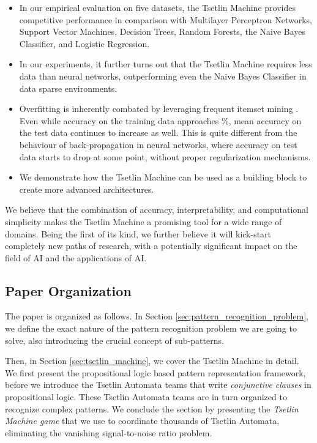 \documentclass[11pt,a4paper]{article}
\begin{document}
\begin{itemize}
\item In our empirical evaluation on five datasets, the Tsetlin Machine provides competitive performance in comparison with Multilayer Perceptron Networks, Support Vector Machines, Decision Trees, Random Forests, the Naive Bayes Classifier, and Logistic Regression.
\item In our experiments, it further turns out that the Tsetlin Machine requires less data than neural networks, outperforming even the Naive Bayes Classifier in data sparse environments.
\item Overfitting is inherently combated by leveraging frequent itemset mining \cite{Haugland2014}. Even while accuracy on the training data approaches \%, mean accuracy on the test data continues to increase as well. This is quite different from the behaviour of back-propagation in neural networks, where accuracy on test data starts to drop at some point, without proper regularization mechanisms.
\item We demonstrate how the Tsetlin Machine can be used as a building block to create more advanced architectures.
\end{itemize}
We believe that the combination of accuracy, interpretability, and computational simplicity makes the Tsetlin Machine a promising tool for a wide range of domains. Being the first of its kind, we further believe it will kick-start completely new paths of research, with a potentially significant impact on the field of AI and the applications of AI.

\subsection{Paper Organization}

The paper is organized as follows. In Section \ref{sec:pattern_recognition_problem}, we define the exact nature of the pattern recognition problem we are going to solve, also introducing the crucial concept of sub-patterns.

Then, in Section \ref{sec:tsetlin_machine}, we cover the Tsetlin Machine in detail. We first present the propositional logic based pattern representation framework, before we introduce the Tsetlin Automata teams that write \emph{conjunctive clauses} in propositional logic. These Tsetlin Automata teams are in turn organized to recognize complex patterns. We conclude the section by presenting the \emph{Tsetlin Machine game} that we use to coordinate thousands of Tsetlin Automata, eliminating the vanishing signal-to-noise ratio problem.
\end{document}
